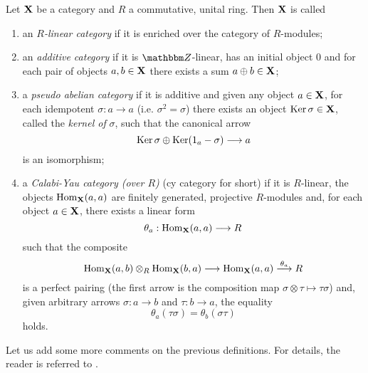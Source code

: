 \begin{defi}\label{linear_cats}
  Let ${\bf X}$ be a category and $R$ a commutative, unital ring. Then
  ${\bf X}$ is called
  \begin{enumerate}

  \item an \emph{$R$-linear category} if it is enriched
    over the category of $R$-modules;

  \item an \emph{additive category} if it is
    $\ent$-linear, has an initial object $0$ and for each pair of
    objects $a,b\in {\bf X}$ there exists a sum $a\oplus b\in {\bf
      X}$;

  \item a \emph{pseudo abelian category} if it is additive
    and given any object $a\in {\bf X}$, for each idempotent $\sigma
    :a\rightarrow a$ (i.e. $\sigma^2=\sigma$) there exists an object
    $\operatorname{Ker} \sigma \in {\bf X}$, called the \emph{kernel of}
    $\sigma$, such that the canonical arrow
    \begin{equation}\label{canonical_arrow}
      \operatorname{Ker} \sigma \oplus \operatorname{Ker} (1_a -\sigma )\longrightarrow a
    \end{equation}
    is an isomorphism;

  \item a \emph{Calabi-Yau category (over $R$)} ({\sc cy} category for
    short) if it is $R$-linear, the objects $\operatorname{Hom}_{{\bf X}}(a,a)$ 
		are finitely generated, projective $R$-modules and, for each object $a\in {\bf X}$, 
		there exists a linear form
$$\theta_a:\operatorname{Hom}_{{\bf X}}(a,a)\longrightarrow R$$
such that the composite
\begin{equation}\label{pair}
  \operatorname{Hom}_{{\bf X}}(a,b)\otimes_R
  \operatorname{Hom}_{{\bf X}}(b,a)\longrightarrow 
  \operatorname{Hom}_{{\bf X}}(a,a)\stackrel{\theta_a}{\longrightarrow }R
\end{equation}
is a perfect pairing (the first arrow is the composition map $\sigma
\otimes \tau \mapsto \tau \sigma$) and, given arbitrary arrows $\sigma
:a\to b$ and $\tau :b\to a$, the equality
$$\theta_a(\tau \sigma )=\theta_b(\sigma \tau )$$
holds.
\end{enumerate}
\end{defi}

Let us add some more comments on the previous definitions. For
details, the reader is referred to 
\cite{maclane:_catwm, kn:grothendieck_sga2, freyd:abelian, costello07:_tcft_cy}.

